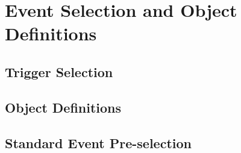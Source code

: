 \section{Event Selection and Object Definitions}
\label{sec:stop_event_sel}

\subsection{Trigger Selection}
\label{sec:stop_trigger}

\subsection{Object Definitions}
\label{sec:stop_object_def}

\subsection{Standard Event Pre-selection}
\label{sec:stop_preselection}
